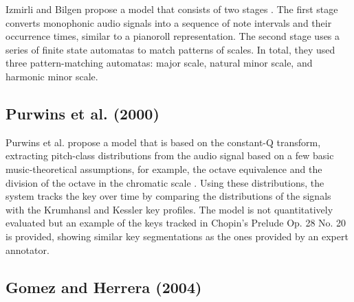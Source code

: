 Izmirli and Bilgen propose a model that consists of two stages \cite{izmirli1994recognition}. The first stage converts monophonic audio signals into a sequence of note intervals and their occurrence times, similar to a pianoroll representation. The second stage uses a series of finite state automatas to match patterns of scales. In total, they used three pattern-matching automatas: major scale, natural minor scale, and harmonic minor scale.

\subsection{Purwins et al. (2000)}

Purwins et al. propose a model that is based on the constant-Q transform, extracting pitch-class distributions from the audio signal based on a few basic music-theoretical assumptions, for example, the octave equivalence and the division of the octave in the chromatic scale \cite{purwins2000new}. Using these distributions, the system tracks the key over time by comparing the distributions of the signals with the Krumhansl and Kessler key profiles. The model is not quantitatively evaluated but an example of the keys tracked in Chopin's Prelude Op. 28 No. 20 is provided, showing similar key segmentations as the ones provided by an expert annotator.


\subsection{Gomez and Herrera (2004)}

